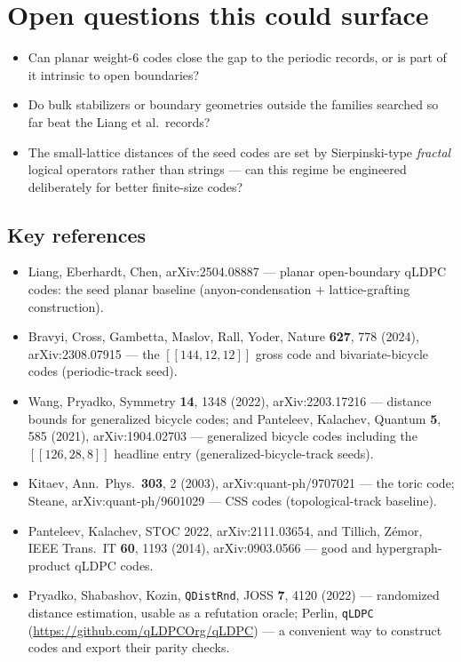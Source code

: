 \documentclass[11pt]{article}
\begin{document}
	\section{Open questions this could surface}

	\begin{itemize}[nosep]
		\item Can planar weight-6 codes close the gap to the periodic records,
		or is part of it intrinsic to open boundaries?
		\item Do bulk stabilizers or boundary geometries outside the families
		searched so far beat the Liang et al.\ records?
		\item The small-lattice distances of the seed codes are set by
		Sierpinski-type \emph{fractal} logical operators rather than strings ---
		can this regime be engineered deliberately for better finite-size codes?
	\end{itemize}

	\subsection*{Key references}
	\begin{itemize}[nosep]
		\item Liang, Eberhardt, Chen, arXiv:2504.08887 --- planar open-boundary
		qLDPC codes: the seed planar baseline (anyon-condensation $+$
		lattice-grafting construction).
		\item Bravyi, Cross, Gambetta, Maslov, Rall, Yoder, Nature
		\textbf{627}, 778 (2024), arXiv:2308.07915 --- the $[[144,12,12]]$ gross
		code and bivariate-bicycle codes (periodic-track seed).
		\item Wang, Pryadko, Symmetry \textbf{14}, 1348 (2022),
		arXiv:2203.17216 --- distance bounds for generalized bicycle codes; and
		Panteleev, Kalachev, Quantum \textbf{5}, 585 (2021), arXiv:1904.02703
		--- generalized bicycle codes including the $[[126,28,8]]$ headline
		entry (generalized-bicycle-track seeds).
		\item Kitaev, Ann.\ Phys.\ \textbf{303}, 2 (2003),
		arXiv:quant-ph/9707021 --- the toric code; Steane,
		arXiv:quant-ph/9601029 --- CSS codes (topological-track baseline).
		\item Panteleev, Kalachev, STOC 2022, arXiv:2111.03654, and Tillich,
		Z\'emor, IEEE Trans.\ IT \textbf{60}, 1193 (2014), arXiv:0903.0566 ---
		good and hypergraph-product qLDPC codes.
		\item Pryadko, Shabashov, Kozin, \texttt{QDistRnd}, JOSS \textbf{7}, 4120
		(2022) --- randomized distance estimation, usable as a refutation
		oracle; Perlin, \texttt{qLDPC} (\url{https://github.com/qLDPCOrg/qLDPC})
		--- a convenient way to construct codes and export their parity checks.
	\end{itemize}
\end{document}
